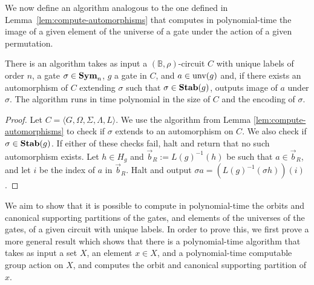 \documentclass[../paper.tex]{subfiles}
\begin{document}
We now define an algorithm analogous to the one defined in
Lemma~\ref{lem:compute-automorphisms} that computes in polynomial-time the image
of a given element of the universe of a gate under the action of a given
permutation.

\begin{lem}
  There is an algorithm takes as input a $(\mathbb{B}, \rho)$-circuit $C$ with
  unique labels of order $n$, a gate $\sigma \in \text{\textbf{Sym}}_n$, $g$ a gate in $C$, and
  $a \in \text{unv}(g)$ and, if there exists an automorphism of $C$ extending
  $\sigma$ such that $\sigma \in \text{\textbf{Stab}}(g)$, outputs image of $a$ under $\sigma$.
  The algorithm runs in time polynomial in the size of $C$ and the encoding of
  $\sigma$.
  \label{lem:compute-automorphisms-labels}
\end{lem}
\begin{proof}
  Let $C = \langle G, \Omega, \Sigma, \Lambda, L \rangle$. We use the algorithm
  from Lemma \ref{lem:compute-automorphisms} to check if $\sigma$ extends to an
  automorphism on $C$. We also check if $\sigma \in \text{\textbf{Stab}}(g)$. If either of
  these checks fail, halt and return that no such automorphism exists. Let $h
  \in H_g$ and $\vec{b}_R := L(g)^{-1}(h)$ be such that $a \in \vec{b}_R$, and
  let $i$ be the index of $a$ in $\vec{b}_R$. Halt and output $\sigma a =
  (L(g)^{-1}(\sigma h))(i)$.
\end{proof}

We aim to show that it is possible to compute in polynomial-time the orbits and
canonical supporting partitions of the gates, and elements of the universes of
the gates, of a given circuit with unique labels. In order to prove this, we
first prove a more general result which shows that there is a polynomial-time
algorithm that takes as input a set $X$, an element $x \in X$, and a
polynomial-time computable group action on $X$, and computes the orbit and
canonical supporting partition of $x$.
\end{document}
